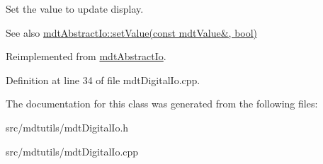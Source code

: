 Set the value to update display. 

\begin{DoxySeeAlso}{See also}
\hyperlink{classmdt_abstract_io_a3f5fc9ed13c2ec2aad0987cd15d95e31}{mdtAbstractIo::setValue(const mdtValue\&, bool)} 
\end{DoxySeeAlso}


Reimplemented from \hyperlink{classmdt_abstract_io_a3f5fc9ed13c2ec2aad0987cd15d95e31}{mdtAbstractIo}.



Definition at line 34 of file mdtDigitalIo.cpp.



The documentation for this class was generated from the following files:\begin{DoxyCompactItemize}
\item 
src/mdtutils/mdtDigitalIo.h\item 
src/mdtutils/mdtDigitalIo.cpp\end{DoxyCompactItemize}
